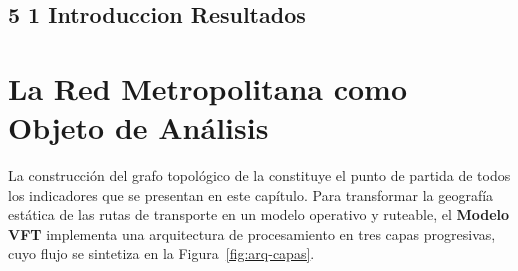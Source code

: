 \subsection*{5 1 Introduccion Resultados}
\section{La Red Metropolitana como Objeto de Análisis}
\label{sec:intro-resultados}

La construcción del grafo topológico de la \zmvm constituye el punto de partida
de todos los indicadores que se presentan en este capítulo. Para transformar la
geografía estática de las rutas de transporte en un modelo operativo y ruteable,
el \textbf{Modelo VFT} implementa una arquitectura de procesamiento en tres
capas progresivas, cuyo flujo se sintetiza en la Figura~\ref{fig:arq-capas}.

